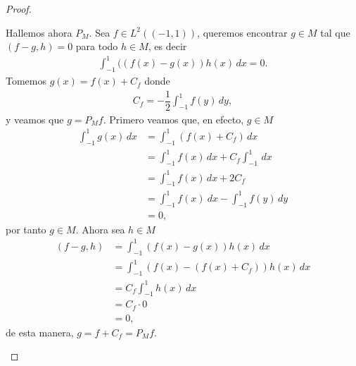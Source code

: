 \begin{proof}
\begin{enumerate}
\begin{enumerate}
        Hallemos ahora $P_M$. Sea $f\in L^2((-1,1))$, queremos encontrar $g\in M$ tal que $(f-g,h)=0$ para todo $h \in M$, es decir
        \begin{align*}
            \int_{-1}^1 ((f(x)-g(x))h(x)\, dx=0.
        \end{align*}
        Tomemos $g(x)=\displaystyle f(x)+C_f$ donde
        \begin{align*}
            C_f=-\dfrac{1}{2}\int_{-1}^1 f(y)\, dy,
        \end{align*}
        y veamos que $g=P_M f$. Primero veamos que, en efecto, $g \in M$ 
        \begin{align*}
            \int_{-1}^1g(x)\, dx&=\int_{-1}^1 (f(x)+C_f)\, dx\\
            &=\int_{-1}^1f(x)\, dx+C_f\int_{-1}^1\, dx\\
            &=\int_{-1}^1f(x)\, dx+2C_f\\
            &=\int_{-1}^1 f(x)\ dx-\int_{-1}^1f(y)\, dy\\
            &=0,
        \end{align*}
        por tanto $g \in M$. Ahora sea $h \in M$
        \begin{align*}
            (f-g,h)&=\int_{-1}^1 (f(x)-g(x))h(x)\, dx\\
            &=\int_{-1}^1 (f(x)-(f(x)+C_f))h(x)\, dx\\
            &=C_f\int_{-1}^1h(x)\, dx\\
            &=C_f\cdot 0\\
            &=0,
        \end{align*}
        de esta manera, $g=f+C_f=P_M f$.


\end{enumerate}
\end{enumerate}
\end{proof}
